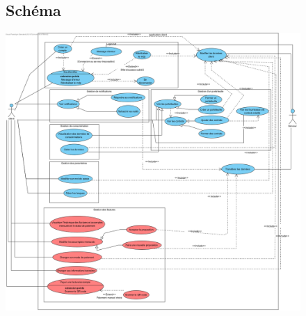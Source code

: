 \begin{figure}[h]
\subsection{Schéma}
\centering
\includegraphics[width = 1\textwidth]{extension-maxime/usescases/img/usecases-extension.png}
\end{figure}



